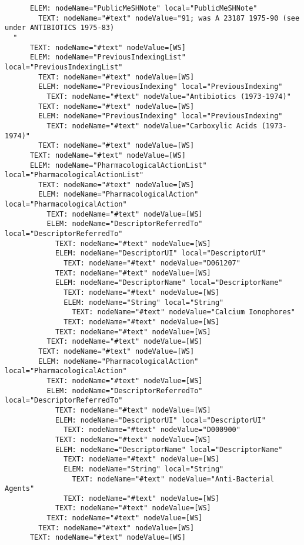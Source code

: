 \documentclass[11pt,english]{article}
\begin{document}
\begin{enumerate}
\begin{lstlisting}
      ELEM: nodeName="PublicMeSHNote" local="PublicMeSHNote"
        TEXT: nodeName="#text" nodeValue="91; was A 23187 1975-90 (see under ANTIBIOTICS 1975-83)
  "
      TEXT: nodeName="#text" nodeValue=[WS]
      ELEM: nodeName="PreviousIndexingList" local="PreviousIndexingList"
        TEXT: nodeName="#text" nodeValue=[WS]
        ELEM: nodeName="PreviousIndexing" local="PreviousIndexing"
          TEXT: nodeName="#text" nodeValue="Antibiotics (1973-1974)"
        TEXT: nodeName="#text" nodeValue=[WS]
        ELEM: nodeName="PreviousIndexing" local="PreviousIndexing"
          TEXT: nodeName="#text" nodeValue="Carboxylic Acids (1973-1974)"
        TEXT: nodeName="#text" nodeValue=[WS]
      TEXT: nodeName="#text" nodeValue=[WS]
      ELEM: nodeName="PharmacologicalActionList" local="PharmacologicalActionList"
        TEXT: nodeName="#text" nodeValue=[WS]
        ELEM: nodeName="PharmacologicalAction" local="PharmacologicalAction"
          TEXT: nodeName="#text" nodeValue=[WS]
          ELEM: nodeName="DescriptorReferredTo" local="DescriptorReferredTo"
            TEXT: nodeName="#text" nodeValue=[WS]
            ELEM: nodeName="DescriptorUI" local="DescriptorUI"
              TEXT: nodeName="#text" nodeValue="D061207"
            TEXT: nodeName="#text" nodeValue=[WS]
            ELEM: nodeName="DescriptorName" local="DescriptorName"
              TEXT: nodeName="#text" nodeValue=[WS]
              ELEM: nodeName="String" local="String"
                TEXT: nodeName="#text" nodeValue="Calcium Ionophores"
              TEXT: nodeName="#text" nodeValue=[WS]
            TEXT: nodeName="#text" nodeValue=[WS]
          TEXT: nodeName="#text" nodeValue=[WS]
        TEXT: nodeName="#text" nodeValue=[WS]
        ELEM: nodeName="PharmacologicalAction" local="PharmacologicalAction"
          TEXT: nodeName="#text" nodeValue=[WS]
          ELEM: nodeName="DescriptorReferredTo" local="DescriptorReferredTo"
            TEXT: nodeName="#text" nodeValue=[WS]
            ELEM: nodeName="DescriptorUI" local="DescriptorUI"
              TEXT: nodeName="#text" nodeValue="D000900"
            TEXT: nodeName="#text" nodeValue=[WS]
            ELEM: nodeName="DescriptorName" local="DescriptorName"
              TEXT: nodeName="#text" nodeValue=[WS]
              ELEM: nodeName="String" local="String"
                TEXT: nodeName="#text" nodeValue="Anti-Bacterial Agents"
              TEXT: nodeName="#text" nodeValue=[WS]
            TEXT: nodeName="#text" nodeValue=[WS]
          TEXT: nodeName="#text" nodeValue=[WS]
        TEXT: nodeName="#text" nodeValue=[WS]
      TEXT: nodeName="#text" nodeValue=[WS]

\end{lstlisting}
\end{enumerate}
\end{document}
